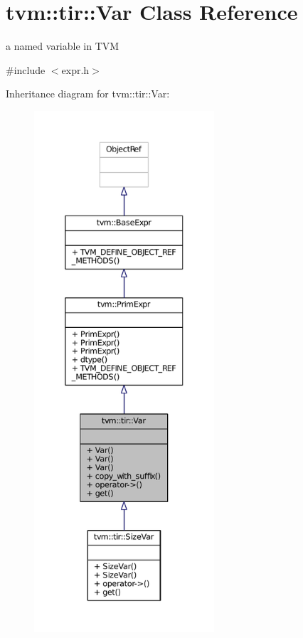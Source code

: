 \hypertarget{classtvm_1_1tir_1_1Var}{}\section{tvm\+:\+:tir\+:\+:Var Class Reference}
\label{classtvm_1_1tir_1_1Var}


a named variable in T\+VM  




{\ttfamily \#include $<$expr.\+h$>$}



Inheritance diagram for tvm\+:\+:tir\+:\+:Var\+:
\nopagebreak
\begin{figure}[H]
\begin{center}
\leavevmode
\includegraphics[height=550pt]{classtvm_1_1tir_1_1Var__inherit__graph}
\end{center}
\end{figure}


